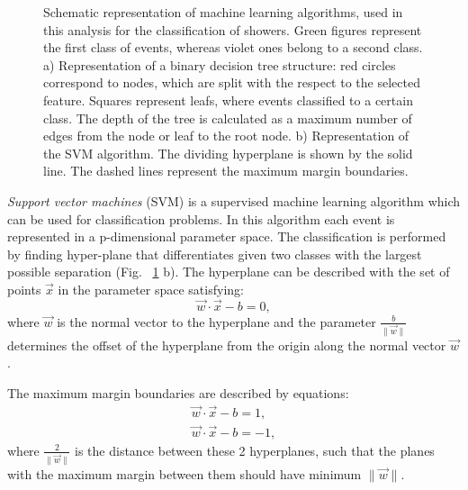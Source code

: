 \begin{figure}[!tbp]
\begin{minipage}[h]{0.49\linewidth}
\end{minipage}
\hfill
\begin{minipage}[h]{0.49\linewidth}
\end{minipage}
\caption{Schematic representation of machine learning algorithms, used in this analysis for the classification of showers. Green figures represent the first class of events, whereas violet ones belong to a second class.  
a) Representation of a binary decision tree structure: red circles correspond to nodes, which are split with the respect to the selected feature. Squares represent leafs, where events classified to a certain class. The depth of the tree is calculated as a maximum number of edges from the node or leaf to the root node. 
b) Representation of the SVM algorithm. The dividing hyperplane is shown by the solid line. The dashed lines represent the maximum margin boundaries.}
\label{fig:MLAlgo}
\end{figure}

\textit{Support vector machines} (SVM) is a supervised machine learning algorithm which can be used for classification problems\cite{VapLer63}. In this algorithm each event is represented in a p-dimensional parameter space. The classification is performed by finding hyper-plane that differentiates given two classes with the largest possible separation (Fig. ~\ref{fig:MLAlgo} b). The hyperplane can be described with the set of points $\vec {x}$ in the parameter space satisfying:
\begin{equation}
\vec{w}\cdot \vec{x} - b = 0,
\end{equation}
where $\vec{w}$ is the normal vector to the hyperplane and the parameter $\frac {b}{\|{\vec {w}}\|}$ determines the offset of the hyperplane from the origin along the normal vector $\vec {w}$. 

The maximum margin boundaries are described by equations:
\begin{eqnarray}
\vec{w}\cdot \vec{x} - b = 1, \\
\vec{w}\cdot \vec{x} - b = -1,
\end{eqnarray}
where $\frac{2}{\|\vec{w}\|}$ is the distance between these 2 hyperplanes, such that the planes with the maximum margin between them should have  minimum $\|\vec{w}\|$. 

